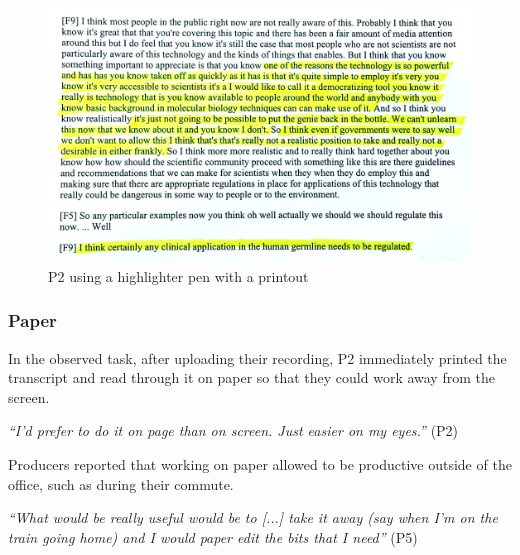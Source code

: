 


\begin{figure}[t]
\centering
  \includegraphics[width=\columnwidth]{figs/highlighting-cropped.jpg}
  \caption{P2 using a highlighter pen with a printout}
  \label{fig:highlight}
\end{figure}

\subsubsection{Paper}
In the observed task, after uploading their recording, P2 immediately printed the transcript and read through it on
paper so that they could work away from the screen.

\textit{``I'd prefer to do it on page than on screen. Just easier on my eyes.''} (P2)

Producers reported that working on paper allowed to be productive outside of the office, such as during their commute.

\textit{``What would be really useful would be to [...] take it away (say when I'm on the train going home) and I would
  paper edit the bits that I need''} (P5)

